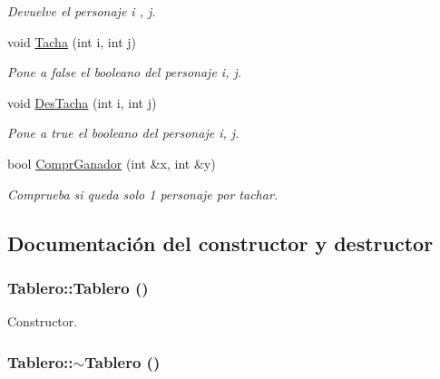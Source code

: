 \begin{CompactItemize}
\begin{CompactList}\small\item\em Devuelve el personaje i , j. \item\end{CompactList}\item 
void \hyperlink{class_tablero_0e4792c5222238268314606d1ef09ef2}{Tacha} (int i, int j)
\begin{CompactList}\small\item\em Pone a false el booleano del personaje i, j. \item\end{CompactList}\item 
void \hyperlink{class_tablero_8a6fc4d7e1a9603f4087f7e83bce75e7}{DesTacha} (int i, int j)
\begin{CompactList}\small\item\em Pone a true el booleano del personaje i, j. \item\end{CompactList}\item 
bool \hyperlink{class_tablero_03cfb33860dba233ce0ee015910773fc}{ComprGanador} (int \&x, int \&y)
\begin{CompactList}\small\item\em Comprueba si queda solo 1 personaje por tachar. \item\end{CompactList}\end{CompactItemize}


\subsection{Documentación del constructor y destructor}
\hypertarget{class_tablero_b4912f28f1db392e1dd44ddc98bd4f59}{
\subsubsection[{Tablero}]{\setlength{\rightskip}{0pt plus 5cm}Tablero::Tablero ()}}
\label{class_tablero_b4912f28f1db392e1dd44ddc98bd4f59}


Constructor. 

\hypertarget{class_tablero_7d4a64967ce0bbe2cce49ec846834c84}{
\subsubsection[{$\sim$Tablero}]{\setlength{\rightskip}{0pt plus 5cm}Tablero::$\sim$Tablero ()}}
\label{class_tablero_7d4a64967ce0bbe2cce49ec846834c84}


